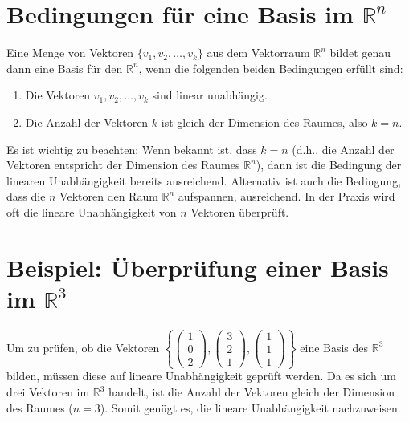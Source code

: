 \section{Bedingungen für eine Basis im $\mathbb{R}^n$}

Eine Menge von Vektoren $\{v_1, v_2, \dots, v_k\}$ aus dem Vektorraum
$\mathbb{R}^n$ bildet genau dann eine Basis für den $\mathbb{R}^n$, wenn die
folgenden beiden Bedingungen erfüllt sind:
\begin{enumerate}
    \item Die Vektoren $v_1, v_2, \dots, v_k$ sind linear unabhängig.
    \item Die Anzahl der Vektoren $k$ ist gleich der Dimension des Raumes, also $k=n$.
\end{enumerate}
Es ist wichtig zu beachten: Wenn bekannt ist, dass $k=n$ (d.h., die Anzahl der Vektoren entspricht der Dimension des Raumes $\mathbb{R}^n$), dann ist die Bedingung der linearen Unabhängigkeit bereits ausreichend. Alternativ ist auch die Bedingung, dass die $n$ Vektoren den Raum $\mathbb{R}^n$ aufspannen, ausreichend. In der Praxis wird oft die lineare Unabhängigkeit von $n$ Vektoren überprüft.

\section{Beispiel: Überprüfung einer Basis im $\mathbb{R}^3$}

Um zu prüfen, ob die Vektoren $\left\{\begin{pmatrix}
        1 \\ 0 \\ 2
    \end{pmatrix}, \begin{pmatrix}
        3 \\ 2 \\ 1
    \end{pmatrix}, \begin{pmatrix}
        1 \\ 1 \\ 1
    \end{pmatrix}\right\}$ eine Basis des $\mathbb{R}^3$ bilden, müssen diese auf lineare Unabhängigkeit geprüft werden. Da es sich um drei Vektoren im $\mathbb{R}^3$ handelt, ist die Anzahl der Vektoren gleich der Dimension des Raumes ($n=3$). Somit genügt es, die lineare Unabhängigkeit nachzuweisen.

